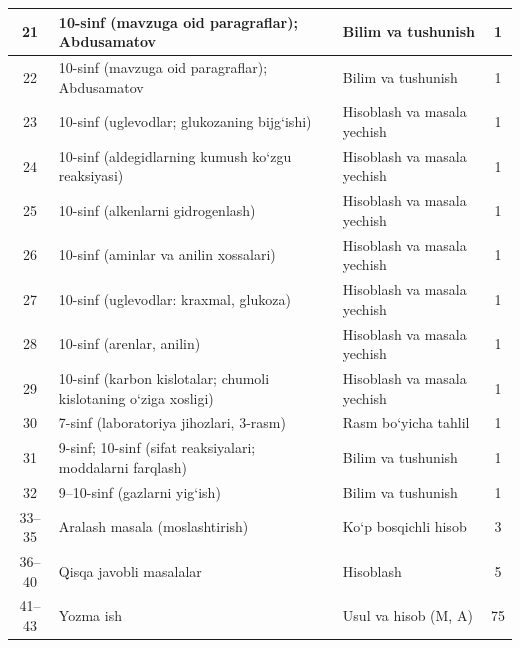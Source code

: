 \documentclass[11pt,a4paper]{article}
\begin{document}
{\begin{longtable}{|c|p{7.2cm}|p{5.4cm}|c|}
21 & 10-sinf (mavzuga oid paragraflar); Abdusamatov & Bilim va tushunish & 1\\\hline
22 & 10-sinf (mavzuga oid paragraflar); Abdusamatov & Bilim va tushunish & 1\\\hline
23 & 10-sinf (uglevodlar; glukozaning bijg`ishi) & Hisoblash va masala yechish & 1\\\hline
24 & 10-sinf (aldegidlarning kumush ko`zgu reaksiyasi) & Hisoblash va masala yechish & 1\\\hline
25 & 10-sinf (alkenlarni gidrogenlash) & Hisoblash va masala yechish & 1\\\hline
26 & 10-sinf (aminlar va anilin xossalari) & Hisoblash va masala yechish & 1\\\hline
27 & 10-sinf (uglevodlar: kraxmal, glukoza) & Hisoblash va masala yechish & 1\\\hline
28 & 10-sinf (arenlar, anilin) & Hisoblash va masala yechish & 1\\\hline
29 & 10-sinf (karbon kislotalar; chumoli kislotaning o`ziga xosligi) & Hisoblash va masala yechish & 1\\\hline
30 & 7-sinf (laboratoriya jihozlari, 3-rasm) & Rasm bo`yicha tahlil & 1\\\hline
31 & 9-sinf; 10-sinf (sifat reaksiyalari; moddalarni farqlash) & Bilim va tushunish & 1\\\hline
32 & 9--10-sinf (gazlarni yig`ish) & Bilim va tushunish & 1\\\hline
33--35 & Aralash masala (moslashtirish) & Ko`p bosqichli hisob & 3\\\hline
36--40 & Qisqa javobli masalalar & Hisoblash & 5\\\hline
41--43 & Yozma ish & Usul va hisob (M, A) & 75\\\hline
\end{longtable}}
\end{document}
